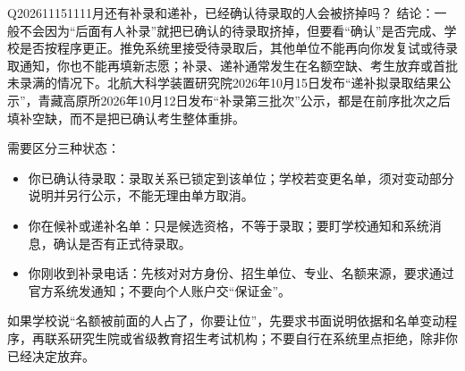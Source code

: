 \begin{qa}{Q2026111511}{11月还有补录和递补，已经确认待录取的人会被挤掉吗？}
结论：一般不会因为“后面有人补录”就把已确认的待录取挤掉，但要看“确认”是否完成、学校是否按程序更正。推免系统里接受待录取后，其他单位不能再向你发复试或待录取通知，你也不能再填新志愿；补录、递补通常发生在名额空缺、考生放弃或首批未录满的情况下。北航大科学装置研究院2026年10月15日发布“递补拟录取结果公示”，青藏高原所2026年10月12日发布“补录第三批次”公示，都是在前序批次之后填补空缺，而不是把已确认考生整体重排。

需要区分三种状态：

\begin{itemize}
\item 你已确认待录取：录取关系已锁定到该单位；学校若变更名单，须对变动部分说明并另行公示，不能无理由单方取消。
\item 你在候补或递补名单：只是候选资格，不等于录取；要盯学校通知和系统消息，确认是否有正式待录取。
\item 你刚收到补录电话：先核对对方身份、招生单位、专业、名额来源，要求通过官方系统发通知；不要向个人账户交“保证金”。
\end{itemize}

如果学校说“名额被前面的人占了，你要让位”，先要求书面说明依据和名单变动程序，再联系研究生院或省级教育招生考试机构；不要自行在系统里点拒绝，除非你已经决定放弃。
\end{qa}
